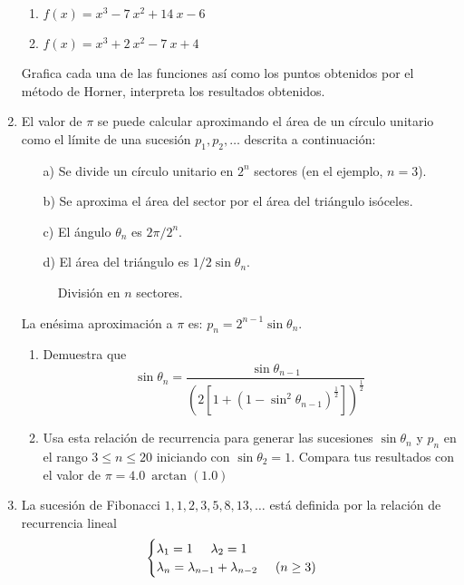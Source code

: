 \begin{enumerate}
\begin{enumerate}
\item $f(x) = x^{3} - 7 \: x^{2} + 14 \: x - 6$
\item $f(x) = x^{3} + 2 \: x^{2} -  7 \: x + 4$
\end{enumerate}
Grafica cada una de las funciones así como los puntos obtenidos por el método de Horner, interpreta los resultados obtenidos.
\item \label{problema_08} El valor de $\pi$ se puede calcular aproximando el área de un círculo unitario como el límite de una sucesión $p_{1}, p_{2}, \ldots$ descrita a continuación:
\begin{enumerate}
\item[a)] Se divide un círculo unitario en $2^{n}$ sectores (en el ejemplo, $n=3$).
\item[b)] Se aproxima el área del sector por el área del triángulo isóceles.
\item[c)] El ángulo $\theta_{n}$ es $2 \pi / 2^{n}$.
\item[d)] El área del triángulo es $1/2 \sin \theta_{n}$.
\end{enumerate}
\begin{figure}[H]
\centering

\caption{División en $n$ sectores.}
\end{figure}
La enésima aproximación a $\pi$ es: $p_{n}= 2^{n-1} \sin \theta_{n}$.
\begin{enumerate}
\item Demuestra que
\[\sin \theta_{n} = \dfrac{\sin \theta_{n - 1}}{\left( 2 \left[ 1 + (1 - \sin^{2}\theta_{n - 1})^{\frac{1}{2}} \right] \right)^{\frac{1}{2}}} \]
\item Usa esta relación de recurrencia para generar las sucesiones $\sin \theta_{n}$ y $p_{n}$ en el rango $3 \leq n \leq 20$ iniciando con $\sin \theta_{2} = 1$. Compara tus resultados con el valor de $\pi = 4.0 \: \arctan(1.0)$
\end{enumerate}
\item La sucesión de Fibonacci $1, 1, 2, 3, 5, 8, 13,\ldots$ está definida por la relación de recurrencia lineal
\begin{equation*}
\begin{cases}
\lambda_{1} = 1 \hspace{0.5cm} \lambda_{2}= 1 \\
\lambda_{n} = \lambda_{n - 1} + \lambda_{n - 2} \hspace{0.5cm} (n \geq 3)
\end{cases}
\end{equation*}

\end{enumerate}
